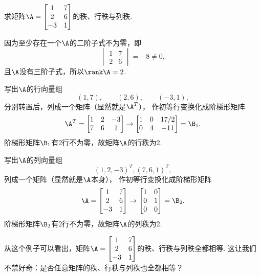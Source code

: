\begin{example}
求矩阵\(\A = \begin{bmatrix} 1 & 7 \\ 2 & 6 \\ -3 & 1 \end{bmatrix}\)的秩、行秩与列秩.
\begin{solution}
因为至少存在一个\(\A\)的二阶子式不为零，即\[
	\begin{vmatrix} 1 & 7 \\ 2 & 6 \end{vmatrix} = -8 \neq 0,
\]
且\(\A\)没有三阶子式，所以\(\rank\A = 2\).

写出\(\A\)的行向量组\[
	(1,7), \qquad
	(2,6), \qquad
	(-3,1),
\]
分别转置后，列成一个矩阵（显然就是\(\A^T\)），
作初等行变换化成阶梯形矩阵\[
	\A^T = \begin{bmatrix}
		1 & 2 & -3 \\
		7 & 6 & 1
	\end{bmatrix} \to \begin{bmatrix}
		1 & 0 & 17/2 \\
		0 & 4 & -11
	\end{bmatrix} = \B_1.
\]阶梯形矩阵\(\B_1\)有2行不为零，故矩阵\(\A\)的行秩为2.

写出\(\A\)的列向量组\[
	(1,2,-3)^T,
	(7,6,1)^T,
\]列成一个矩阵（显然就是\(\A\)本身），
作初等行变换化成阶梯形矩阵\[
	\A = \begin{bmatrix} 1 & 7 \\ 2 & 6 \\ -3 & 1 \end{bmatrix}
	\to \begin{bmatrix} 1 & 0 \\ 0 & 1 \\ 0 & 0 \end{bmatrix} = \B_2.
\]
阶梯形矩阵\(\B_2\)有2行不为零，故矩阵\(\A\)的列秩为2.
\end{solution}
\end{example}
\begin{remark}
从这个例子可以看出，矩阵\(\A = \begin{bmatrix} 1 & 7 \\ 2 & 6 \\ -3 & 1 \end{bmatrix}\)的秩、行秩与列秩全都相等.
这让我们不禁好奇：是否任意矩阵的秩、行秩与列秩也全都相等？
\end{remark}

